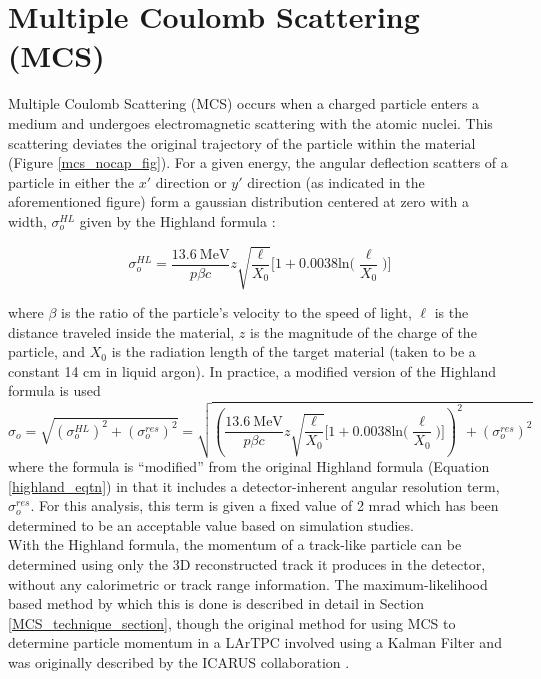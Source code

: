 \documentclass[a4paper,11pt]{article}
\begin{document}
\section{Multiple Coulomb Scattering (MCS)}

Multiple Coulomb Scattering (MCS) occurs when a charged particle enters a medium and undergoes electromagnetic scattering with the atomic nuclei. This scattering deviates the original trajectory of the particle within the material (Figure \ref{mcs_nocap_fig}). For a given energy, the angular deflection scatters of a particle in either the $x'$ direction or $y'$ direction (as indicated in the aforementioned figure) form a gaussian distribution centered at zero with a width, $\sigma_o^{HL}$ given by the Highland formula \cite{highland}: 

\begin{equation}\label{highland_eqtn}
	\sigma_o^{HL}=\frac{13.6\  \text{MeV}}{p\beta c}z\sqrt{\frac{\ell}{X_0}}\Big[1+0.0038\text{ln}\Big(\frac{\ell}{X_0}\Big)\Big]
\end{equation}

\noindent where $\beta$ is the ratio of the particle's velocity to the speed of light, $\ell$ is the distance traveled inside the material, $z$ is the magnitude of the charge of the particle, and $X_0$ is the radiation length of the target material (taken to be a constant 14 cm in liquid argon). In practice, a modified version of the Highland formula is used
\begin{equation}\label{modified_highland_eqtn}
\sigma_{o} = \sqrt{ (\sigma_o^{HL})^2 + (\sigma_o^{res})^2} = \sqrt{ (\frac{13.6\  \text{MeV}}{p\beta c}z\sqrt{\frac{\ell}{X_0}}\Big[1+0.0038\text{ln}\Big(\frac{\ell}{X_0}\Big)\Big])^2 + (\sigma_o^{res})^2 }
\end{equation}
where the formula is ``modified'' from the original Highland formula (Equation \ref{highland_eqtn}) in that it includes a detector-inherent angular resolution term, $\sigma_o^{res}$. For this analysis, this term is given a fixed value of 2 mrad which has been determined to be an acceptable value based on simulation studies.\\


With the Highland formula, the momentum of a track-like particle can be determined using only the 3D reconstructed track it produces in the detector, without any calorimetric or track range information. The maximum-likelihood based method by which this is done is described in detail in Section \ref{MCS_technique_section}, though the original method for using MCS to determine particle momentum in a LArTPC involved using a Kalman Filter and was originally described by the ICARUS collaboration \cite{icarus_mcs_paper}.
\end{document}

